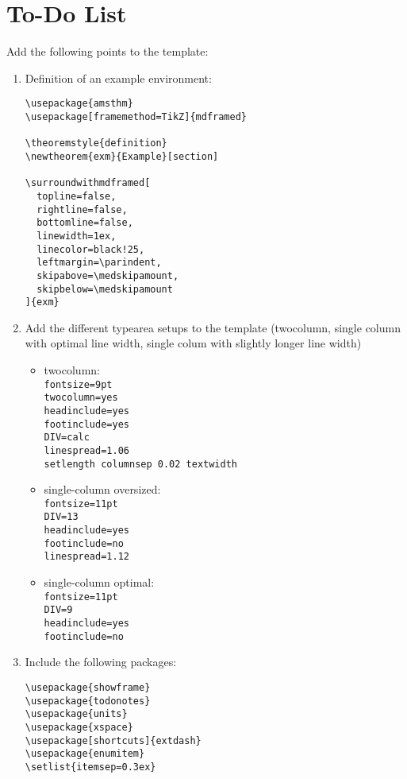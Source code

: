 
\chapter{To-Do List}

Add the following points to the template:
\begin{enumerate}
\item Definition of an example environment:
\begin{verbatim}
\usepackage{amsthm}
\usepackage[framemethod=TikZ]{mdframed}

\theoremstyle{definition}
\newtheorem{exm}{Example}[section]

\surroundwithmdframed[
  topline=false,
  rightline=false,
  bottomline=false,
  linewidth=1ex,
  linecolor=black!25,
  leftmargin=\parindent,
  skipabove=\medskipamount,
  skipbelow=\medskipamount
]{exm}
\end{verbatim}

\item Add the different typearea setups to the template (twocolumn, single column with optimal line width, single colum with slightly longer line width)
  \begin{itemize}
  \item twocolumn:\\ \texttt{fontsize=9pt\\ twocolumn=yes\\ headinclude=yes\\ footinclude=yes\\ DIV=calc\\ linespread=1.06\\ setlength columnsep 0.02 textwidth} 
  \item single-column oversized:\\ \texttt{fontsize=11pt\\ DIV=13\\ headinclude=yes\\ footinclude=no\\ linespread=1.12}
  \item single-column optimal:\\ \texttt{fontsize=11pt\\ DIV=9\\ headinclude=yes\\ footinclude=no}
  \end{itemize}

\item Include the following packages:
\begin{verbatim}
\usepackage{showframe}
\usepackage{todonotes}
\usepackage{units}
\usepackage{xspace}
\usepackage[shortcuts]{extdash}
\usepackage{enumitem}
\setlist{itemsep=0.3ex}
\end{verbatim}


\end{enumerate}
